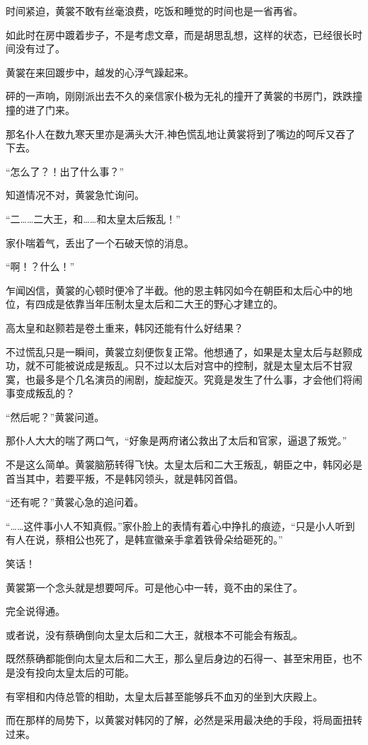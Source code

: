 时间紧迫，黄裳不敢有丝毫浪费，吃饭和睡觉的时间也是一省再省。

如此时在房中踱着步子，不是考虑文章，而是胡思乱想，这样的状态，已经很长时间没有过了。

黄裳在来回踱步中，越发的心浮气躁起来。

砰的一声响，刚刚派出去不久的亲信家仆极为无礼的撞开了黄裳的书房门，跌跌撞撞的进了门来。

那名仆人在数九寒天里亦是满头大汗,神色慌乱地让黄裳将到了嘴边的呵斥又吞了下去。

“怎么了？！出了什么事？”

知道情况不对，黄裳急忙询问。

“二……二大王，和……和太皇太后叛乱！”

家仆喘着气，丢出了一个石破天惊的消息。

“啊！？什么！”

乍闻凶信，黄裳的心顿时便冷了半截。他的恩主韩冈如今在朝臣和太后心中的地位，有四成是依靠当年压制太皇太后和二大王的野心才建立的。

高太皇和赵颢若是卷土重来，韩冈还能有什么好结果？

不过慌乱只是一瞬间，黄裳立刻便恢复正常。他想通了，如果是太皇太后与赵颢成功，就不可能被说成是叛乱。只不过以太后对宫中的控制，就是太皇太后不甘寂寞，也最多是个几名演员的闹剧，旋起旋灭。究竟是发生了什么事，才会他们将闹事变成叛乱的？

“然后呢？”黄裳问道。

那仆人大大的喘了两口气，“好象是两府诸公救出了太后和官家，逼退了叛党。”

不是这么简单。黄裳脑筋转得飞快。太皇太后和二大王叛乱，朝臣之中，韩冈必是首当其中，若要平叛，不是韩冈领头，就是韩冈首倡。

“还有呢？”黄裳心急的追问着。

“……这件事小人不知真假。”家仆脸上的表情有着心中挣扎的痕迹，“只是小人听到有人在说，蔡相公也死了，是韩宣徽亲手拿着铁骨朵给砸死的。”

笑话！

黄裳第一个念头就是想要呵斥。可是他心中一转，竟不由的呆住了。

完全说得通。

或者说，没有蔡确倒向太皇太后和二大王，就根本不可能会有叛乱。

既然蔡确都能倒向太皇太后和二大王，那么皇后身边的石得一、甚至宋用臣，也不是没有投向太皇太后的可能。

有宰相和内侍总管的相助，太皇太后甚至能够兵不血刃的坐到大庆殿上。

而在那样的局势下，以黄裳对韩冈的了解，必然是采用最决绝的手段，将局面扭转过来。

